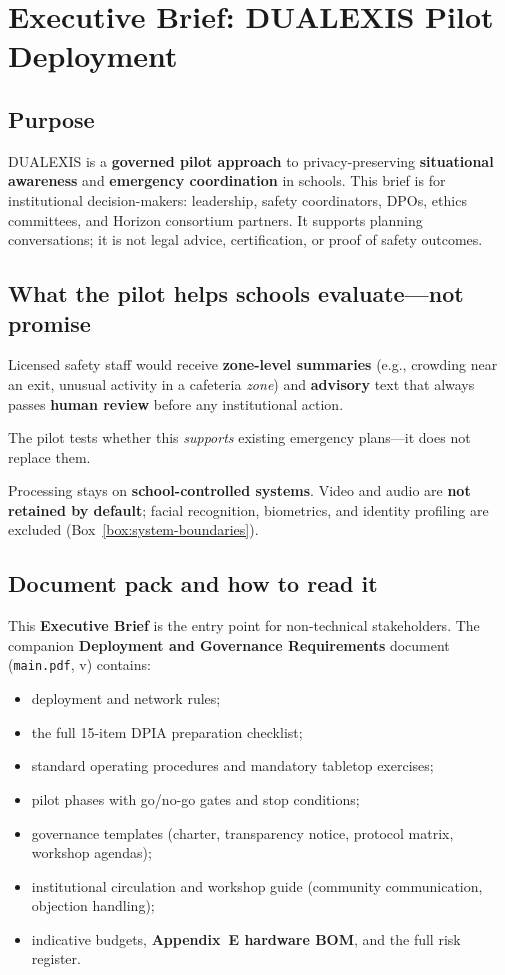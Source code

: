 \section{Executive Brief: DUALEXIS Pilot Deployment}
\label{sec:executive-summary}

\subsection{Purpose}

DUALEXIS is a \textbf{governed pilot approach} to privacy-preserving \textbf{situational awareness}
and \textbf{emergency coordination} in schools.
This brief is for institutional decision-makers: leadership, safety coordinators, DPOs, ethics
committees, and Horizon consortium partners.
It supports planning conversations; it is not legal advice, certification, or proof of safety outcomes.

\subsection{What the pilot helps schools evaluate---not promise}

Licensed safety staff would receive \textbf{zone-level summaries} (e.g., crowding near an exit,
unusual activity in a cafeteria \emph{zone}) and \textbf{advisory} text that always passes
\textbf{human review} before any institutional action.

The pilot tests whether this \emph{supports} existing emergency plans---it does not replace them.

Processing stays on \textbf{school-controlled systems}.
Video and audio are \textbf{not retained by default}; facial recognition, biometrics, and identity
profiling are excluded (Box~\ref{box:system-boundaries}).

\subsection{Document pack and how to read it}

This \textbf{Executive Brief} is the entry point for non-technical stakeholders.
The companion \textbf{Deployment and Governance Requirements} document (\texttt{main.pdf},
v\docversion) contains:
\begin{itemize}[noitemsep]
  \item deployment and network rules;
  \item the full 15-item DPIA preparation checklist;
  \item standard operating procedures and mandatory tabletop exercises;
  \item pilot phases with go/no-go gates and stop conditions;
  \item governance templates (charter, transparency notice, protocol matrix, workshop agendas);
  \item institutional circulation and workshop guide (community communication, objection handling);
  \item indicative budgets, \textbf{Appendix~E hardware BOM}, and the full risk register.
\end{itemize}

